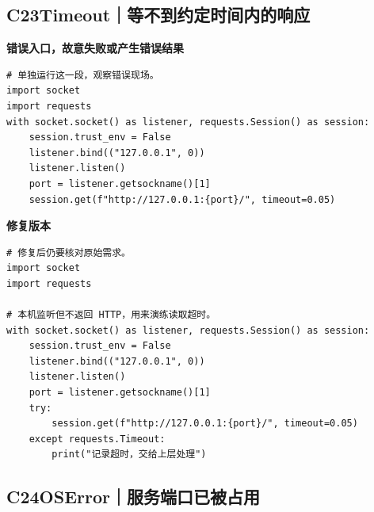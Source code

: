 \subsection*{C23\enspace Timeout｜等不到约定时间内的响应}





\textbf{错误入口，故意失败或产生错误结果}

\begin{lstlisting}[style=errorcode,title={错误复现（故意失败或错误结果）：\code{case_23_bad.py.txt}}]
# 单独运行这一段，观察错误现场。
import socket
import requests
with socket.socket() as listener, requests.Session() as session:
    session.trust_env = False
    listener.bind(("127.0.0.1", 0))
    listener.listen()
    port = listener.getsockname()[1]
    session.get(f"http://127.0.0.1:{port}/", timeout=0.05)
\end{lstlisting}

\textbf{修复版本}

\begin{lstlisting}[title={\code{case_23.py}}]
# 修复后仍要核对原始需求。
import socket
import requests

# 本机监听但不返回 HTTP，用来演练读取超时。
with socket.socket() as listener, requests.Session() as session:
    session.trust_env = False
    listener.bind(("127.0.0.1", 0))
    listener.listen()
    port = listener.getsockname()[1]
    try:
        session.get(f"http://127.0.0.1:{port}/", timeout=0.05)
    except requests.Timeout:
        print("记录超时，交给上层处理")
\end{lstlisting}


\subsection*{C24\enspace OSError｜服务端口已被占用}


